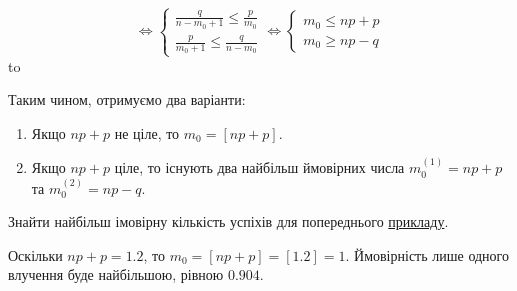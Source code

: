$$
\Leftrightarrow
\begin{cases}
    \frac{q}{n-m_0+1} \leq \frac{p}{m_0} \\
    \frac{p}{m_0 + 1} \leq \frac{q}{n-m_0}
\end{cases}
\Leftrightarrow
\begin{cases}
    m_0 \leq np+p\\
    m_0 \geq np-q
\end{cases}
$$
\hbox to 

Таким чином, отримуємо два варіанти:
\begin{enumerate}
    \item Якщо $np+p$ не ціле, то $m_0 = \left[np+p\right]$.
    \item Якщо $np+p$ ціле, то існують два найбільш ймовірних числа $m_0^{(1)} = np+p$ та $m_0^{(2)} = np-q$.
\end{enumerate}

\begin{example}
    Знайти найбільш імовірну кількість успіхів для попереднього \hyperref[ex:sportsman]{прикладу}.

    Оскільки $np + p = 1.2$, то $m_0 = \left[np + p\right] = \left[1.2\right] = 1$.
    Ймовірність лише одного влучення буде найбільшою, рівною $0.904$.
\end{example}

